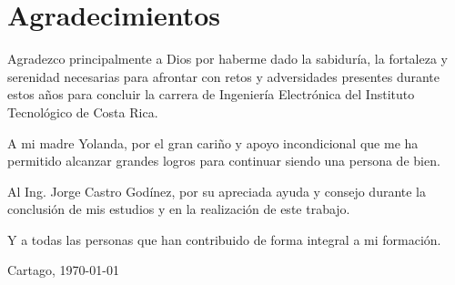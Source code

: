 \chapter*{Agradecimientos}
\thispagestyle{empty}

Agradezco principalmente a Dios por haberme dado la sabiduría, la fortaleza y serenidad necesarias para afrontar con retos y adversidades presentes durante estos años para concluir la carrera de Ingeniería Electrónica del Instituto Tecnológico de Costa Rica.

A mi madre Yolanda, por el gran cariño y apoyo incondicional que me ha permitido alcanzar grandes logros para continuar siendo una persona de bien.

Al Ing. Jorge Castro Godínez, por su apreciada ayuda y consejo durante la conclusión de mis estudios y en la realización de este trabajo.

Y a todas las personas que han contribuido de forma integral a mi formación.
\vspace*{1cm}

\scriptAuthor

Cartago, \today

\cleardoublepage

